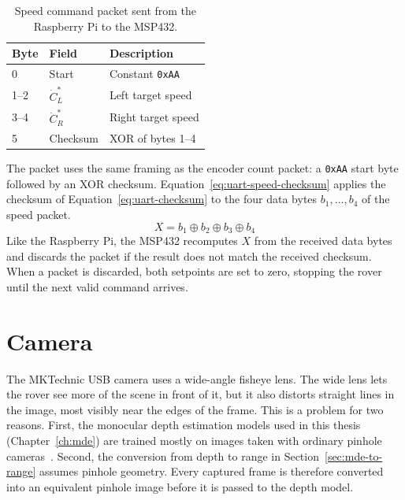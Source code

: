 \begin{table}[htbp]
  \centering
  \caption{Speed command packet sent from the Raspberry Pi to the MSP432.}
  \label{tab:speed-packet}
  \small
  \begin{tabular}{l l l}
    \hline
    Byte & Field & Description \\
    \hline
    0     & Start    & Constant \texttt{0xAA} \\
    1--2  & $\dot{C}^*_L$ & Left target speed\\
    3--4  & $\dot{C}^*_R$ & Right target speed\\
    5     & Checksum & XOR of bytes 1--4 \\
    \hline
  \end{tabular}
\end{table}

The packet uses the same framing as the encoder count packet: a \texttt{0xAA} start byte
followed by an XOR checksum. Equation~\ref{eq:uart-speed-checksum} applies the checksum of
Equation~\ref{eq:uart-checksum} to the four data bytes $b_1, \dots, b_4$ of the speed
packet.
\begin{equation}
  X = b_1 \oplus b_2 \oplus b_3 \oplus b_4
  \label{eq:uart-speed-checksum}
\end{equation}
Like the Raspberry Pi, the MSP432 recomputes $X$ from the received data bytes and discards the packet if the
result does not match the received checksum. When a packet is discarded, both setpoints are
set to zero, stopping the rover until the next valid command arrives.

\section{Camera}
\label{sec:camera}

The MKTechnic USB camera uses a wide-angle fisheye lens. The wide lens lets the rover see
more of the scene in front of it, but it also distorts straight lines in the image, most
visibly near the edges of the frame. This is a problem for two reasons. First,
the monocular depth estimation models used in this thesis (Chapter~\ref{ch:mde}) are
trained mostly on images taken with ordinary pinhole cameras~\cite{virtualkitti2,hypersim}.
Second, the conversion from depth to range in Section~\ref{sec:mde-to-range} assumes
pinhole geometry. Every captured frame is therefore converted into an equivalent pinhole
image before it is passed to the depth model.

